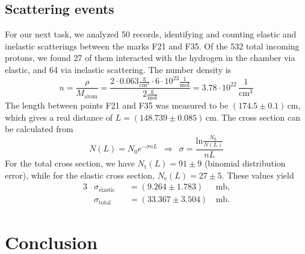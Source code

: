 \documentclass[twocolumn]{article}
\begin{document}
\subsection{Scattering events}
For our next task, we analyzed 50 records, identifying and counting elastic and inelastic scatterings between the marks F21 and F35. Of the 532 total incoming protons, we found 27 of them interacted with the hydrogen in the chamber via elastic, and 64 via inelastic scattering. The number density is
\begin{equation}
n = \frac{\rho}{M_{\text{atom}}} = \frac{2 \cdot 0.063 \frac{\text{g}}{\text{cm}^3} \cdot 6 \cdot 10^{23} \frac{1}{\text{mol}}}{2 \frac{\text{g}}{\text{mol}}} = 3.78 \cdot 10^{22} \, \frac{1}{\text{cm}^3} \nonumber
\end{equation}
The length between points F21 and F35 was measured to be $(174.5 \pm 0.1)\,$cm, which gives a real distance of $L=(148.739 \pm 0.085)\,$cm. The cross section can be calculated from
\begin{equation}
N(L) = N_0 e^{- \sigma n L} \hspace{6pt} \Longrightarrow \hspace{6pt} \sigma =  \frac{\text{ln} \frac{N_0}{N(L)} }{n L}  \nonumber
\end{equation}
For the total cross section, we have %
$N_{\text{t}}(L) = 91 \pm 9$ (binomial distribution error), while for the elastic cross section, $N_{\text{e}}(L) = 27 \pm 5$. These values yield
\begin{alignat*}{3}
&\sigma_{\text{elastic}} &&= (9.264 \pm 1.783) \, &\text{mb,}\\
&\sigma_{\text{total}} &&= (33.367 \pm 3.504) \, &\text{mb.} 
\end{alignat*}

\section{Conclusion}
\end{document}
